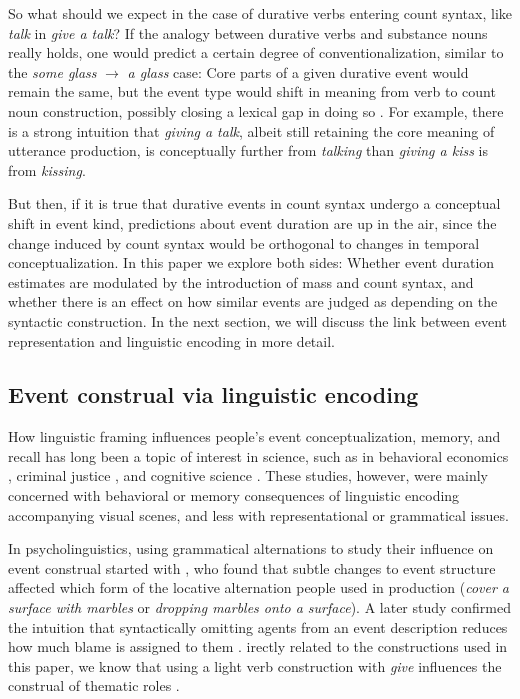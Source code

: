 \documentclass[review,12pt,authoryear]{elsarticle}
\newcommand*{\sectionformat}{\centering}
\begin{document}
So what should we expect in the case of durative verbs entering count syntax, like \emph{talk} in \emph{give a talk}? If the analogy between durative verbs and substance nouns really holds, one would predict a certain degree of conventionalization, similar to the \emph{some glass} $\rightarrow$ \emph{a glass} case: Core parts of a given durative event would remain the same, but the event type would shift in meaning from verb to count noun construction, possibly closing a lexical gap in doing so \citep{Allerton2002,miyagawa1989light,Grimshaw1988,glatz2006funktionsverbgefuge}. For example, there is a strong intuition that \emph{giving a talk}, albeit still retaining the core meaning of utterance production, is conceptually further from \emph{talking} than \emph{giving a kiss} is from \emph{kissing}.

But then, if it is true that durative events in count syntax undergo a conceptual shift in event kind, predictions about event duration are up in the air, since the change induced by count syntax would be orthogonal to changes in temporal conceptualization. In this paper we explore both sides: Whether event duration estimates are modulated by the introduction of mass and count syntax, and whether there is an effect on how similar events are judged as depending on the syntactic construction. In the next section, we will discuss the link between event representation and linguistic encoding in more detail.

\subsection*{\sectionformat Event construal via linguistic encoding}
How linguistic framing influences people's event conceptualization, memory, and recall has long been a topic of interest in science, such as in behavioral economics  \citep{kahneman1977intuitive, roy2005underestimating,kruger2004if,halkjelsvik2011read}, criminal justice \citep{loftus1987time,tse2004attention,macar1994controlled,boltz1995effects}, and cognitive science \citep{madden2003does,magliano2000verb}. These studies, however, were mainly concerned with behavioral or memory consequences of linguistic encoding accompanying visual scenes, and less with representational or grammatical issues.

In psycholinguistics, using grammatical alternations to study their influence on event construal started with \citet{gropen1991}, who found that subtle changes to event structure affected which form of the locative alternation people used in production (\emph{cover a surface with marbles} or \emph{dropping marbles onto a surface}). A later study confirmed the intuition that  syntactically omitting agents from an event description reduces how much blame is assigned to them \citep{fausey2010}. irectly related to the constructions used in this paper, we know that using a light verb construction with \emph{give} influences the construal of thematic roles \citep{wittenberg2014sorting,Wittenbergunderreview}. 
\end{document}
